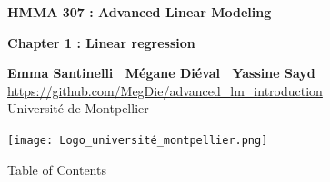 \documentclass[unknownkeysallowed]{beamer}
\begin{document}



\begin{frame}
\bigskip
\bigskip
\begin{center}{
\LARGE\color{marron}
\textbf{HMMA 307 : Advanced Linear Modeling}
\textbf{ }\\
\vspace{0.5cm}
}

\color{marron}
\textbf{Chapter 1 : Linear regression}
\end{center}

\vspace{0.5cm}

\begin{center}
\textbf{Emma Santinelli \ Mégane Diéval \ Yassine Sayd} \\
\vspace{0.1cm}
\url{https://github.com/MegDie/advanced_lm_introduction}\\
\vspace{0.5cm}
Université de Montpellier \\
\end{center}

\centering
\texttt{[image: Logo\_université\_montpellier.png]}

\end{frame}






\begin{frame}{Table of Contents}
\tableofcontents[hideallsubsections]
\end{frame}



\end{document}
